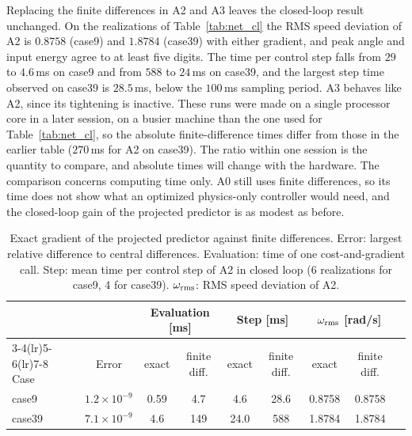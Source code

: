 \documentclass[preprint,12pt]{elsarticle}
\begin{document}
Replacing the finite differences in A2 and A3 leaves the closed-loop result unchanged. On the realizations of Table~\ref{tab:net_cl} the RMS speed deviation of A2 is $0.8758$ (case9) and $1.8784$ (case39) with either gradient, and peak angle and input energy agree to at least five digits. The time per control step falls from $29$ to $4.6$\,ms on case9 and from $588$ to $24$\,ms on case39, and the largest step time observed on case39 is $28.5$\,ms, below the $100$\,ms sampling period. A3 behaves like A2, since its tightening is inactive. These runs were made on a single processor core in a later session, on a busier machine than the one used for Table~\ref{tab:net_cl}, so the absolute finite-difference times differ from those in the earlier table ($270$\,ms for A2 on case39). The ratio within one session is the quantity to compare, and absolute times will change with the hardware. The comparison concerns computing time only. A0 still uses finite differences, so its time does not show what an optimized physics-only controller would need, and the closed-loop gain of the projected predictor is as modest as before.

\begin{table}[!t]\centering\small
\setlength{\tabcolsep}{4pt}
\caption{Exact gradient of the projected predictor against finite differences. Error: largest relative difference to central differences. Evaluation: time of one cost-and-gradient call. Step: mean time per control step of A2 in closed loop (6 realizations for case9, 4 for case39). $\omega_{\rm rms}$: RMS speed deviation of A2.}
\label{tab:grad}
\begin{tabular}{lcccccccc}
\toprule
 & & \multicolumn{2}{c}{Evaluation [ms]} & \multicolumn{2}{c}{Step [ms]} & \multicolumn{2}{c}{$\omega_{\rm rms}$ [rad/s]}\\
\cmidrule(lr){3-4}\cmidrule(lr){5-6}\cmidrule(lr){7-8}
Case & Error & exact & finite diff. & exact & finite diff. & exact & finite diff.\\
\midrule
case9 & $1.2\times10^{-9}$ & 0.59 & 4.7 & 4.6 & 28.6 & 0.8758 & 0.8758\\
case39 & $7.1\times10^{-9}$ & 4.6 & 149 & 24.0 & 588 & 1.8784 & 1.8784\\
\bottomrule
\end{tabular}
\end{table}
\end{document}
